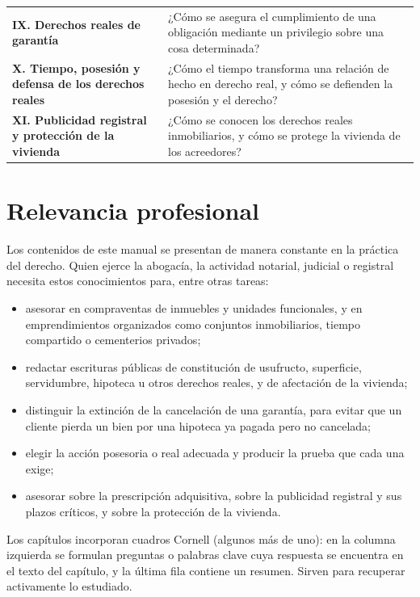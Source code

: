 \documentclass[12pt,oneside]{book}
\begin{document}
\begin{center}
\begin{tabularx}{\textwidth}{@{}>{\raggedright\arraybackslash}p{}>{\raggedright\arraybackslash}X@{}}
\textbf{IX. Derechos reales de garantía} & ¿Cómo se asegura el cumplimiento de una obligación mediante un privilegio sobre una cosa determinada? \\
\textbf{X. Tiempo, posesión y defensa de los derechos reales} & ¿Cómo el tiempo transforma una relación de hecho en derecho real, y cómo se defienden la posesión y el derecho? \\
\textbf{XI. Publicidad registral y protección de la vivienda} & ¿Cómo se conocen los derechos reales inmobiliarios, y cómo se protege la vivienda de los acreedores? \\
\bottomrule
\end{tabularx}
\end{center}

\section*{Relevancia profesional}

Los contenidos de este manual se presentan de manera constante en la práctica del derecho. Quien ejerce la abogacía, la actividad notarial, judicial o registral necesita estos conocimientos para, entre otras tareas:

\begin{itemize}
    \item asesorar en compraventas de inmuebles y unidades funcionales, y en emprendimientos organizados como conjuntos inmobiliarios, tiempo compartido o cementerios privados;
    \item redactar escrituras públicas de constitución de usufructo, superficie, servidumbre, hipoteca u otros derechos reales, y de afectación de la vivienda;
    \item distinguir la extinción de la cancelación de una garantía, para evitar que un cliente pierda un bien por una hipoteca ya pagada pero no cancelada;
    \item elegir la acción posesoria o real adecuada y producir la prueba que cada una exige;
    \item asesorar sobre la prescripción adquisitiva, sobre la publicidad registral y sus plazos críticos, y sobre la protección de la vivienda.
\end{itemize}

\begin{nota}
Los capítulos incorporan cuadros Cornell (algunos más de uno): en la columna izquierda se formulan preguntas o palabras clave cuya respuesta se encuentra en el texto del capítulo, y la última fila contiene un resumen. Sirven para recuperar activamente lo estudiado.
\end{nota}
\end{document}
